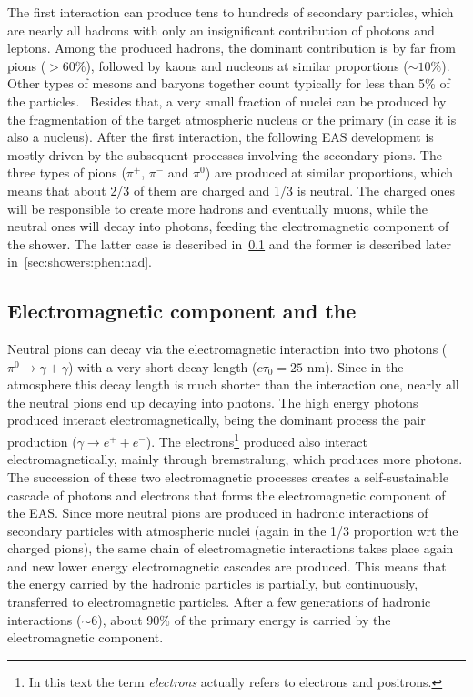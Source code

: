 The first interaction can produce tens to hundreds of
secondary particles, which are nearly all hadrons
with only an insignificant contribution of photons and leptons.
Among the produced hadrons, the dominant contribution is by far from pions ($>60\%$),
followed by kaons and nucleons at similar proportions ($\sim 10\%$). Other
types of mesons and baryons together count typically for less than 5\% of
the particles.~\cite{Calcagni:2017tws}
Besides that, a very small fraction of nuclei can be produced
by the fragmentation of the target atmospheric nucleus or the primary (in case it is also a nucleus).
After the first interaction, the following EAS development is mostly driven
by the subsequent processes involving the secondary pions.
The three types of pions ($\pi^+$, $\pi^-$ and $\pi^0$)
are produced at similar proportions, which means that about 2/3 of them are charged and
1/3 is neutral. The charged ones will be responsible to create more
hadrons and eventually muons, while the neutral ones will decay into photons,
feeding the electromagnetic component of the shower.
The latter case is described in~\cref{sec:showers:phen:em}
and the former is described later in~\cref{sec:showers:phen:had}. 

\subsection[Electromagnetic component and the \xmax]{\boldmath Electromagnetic component and the \xmax}
\label{sec:showers:phen:em}


Neutral pions can decay via the electromagnetic interaction
into two photons ($\pi^0\rightarrow \gamma+\gamma$)
with a very short decay length ($c\tau_0=25$ nm). Since in the atmosphere this decay length
is much shorter than the interaction one, nearly all the neutral pions end up decaying into
photons. The high energy photons produced interact electromagnetically, being the dominant
process the pair production ($\gamma\rightarrow e^++e^-$).
The electrons\footnote{In this text the term \emph{electrons} actually refers to electrons and positrons.} 
produced also interact electromagnetically, mainly through bremstralung, which
produces more photons. The succession of these two electromagnetic processes
creates a self-sustainable cascade of photons and electrons
that forms the electromagnetic component of the EAS.
Since more neutral pions are produced in hadronic interactions of secondary
particles with atmospheric nuclei (again in the 1/3 proportion wrt the charged pions),
the same chain of electromagnetic interactions takes place again
and new lower energy electromagnetic cascades are produced.
This means that the energy carried by the hadronic particles
is partially, but continuously, transferred to electromagnetic particles.
After a few generations of hadronic interactions ($\sim 6$), about 90\% of
the primary energy is carried by the electromagnetic component.



